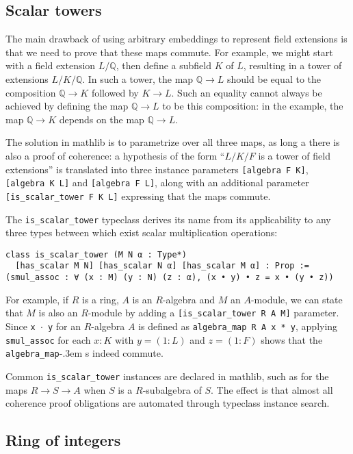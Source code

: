 \documentclass[a4paper,USenglish,cleveref, autoref, thm-restate]{lipics-v2021}
\newcommand{\lean}[1]{\texttt{#1}\xspace} %
\newcommand{\mathlib}{\textsf{mathlib}\xspace}
\newcommand{\Q}{\mathbb{Q}}
\begin{document}
\subsection{Scalar towers} \label{sec:scalar_tower}

The main drawback of using arbitrary embeddings to represent field extensions is that we need to prove that these maps commute.
For example, we might start with a field extension $L / \Q$, then define a subfield $K$ of $L$,
resulting in a tower of extensions $L / K / \Q$.
In such a tower, the map $\Q \to L$ should be equal to the composition $\Q \to K$ followed by $K \to L$.
Such an equality cannot always be achieved by defining the map $\Q \to L$ to be this composition: in the example, the map $\Q \to K$ depends on the map $\Q \to L$.

The solution in \mathlib is to parametrize over all three maps, as long a there is also a proof of coherence:
a hypothesis of the form ``$L / K / F$ is a tower of field extensions'' is translated into three instance parameters \lean{[algebra F K]}, \lean{[algebra K L]} and \lean{[algebra F L]},
along with an additional parameter \lean{[is\_scalar\_tower F K L]} expressing that the maps commute.

The \lean{is\_scalar\_tower} typeclass derives its name from its applicability to any three types between which exist scalar multiplication operations:
\begin{lstlisting}
class is_scalar_tower (M N α : Type*)
  [has_scalar M N] [has_scalar N α] [has_scalar M α] : Prop :=
(smul_assoc : ∀ (x : M) (y : N) (z : α), (x • y) • z = x • (y • z))
\end{lstlisting}
For example, if $R$ is a ring, $A$ is an $R$-algebra and $M$ an $A$-module, we can state that $M$ is also an $R$-module by adding a \lean{[is\_scalar\_tower R A M]} parameter.
Since \lean{x~$\cdot$~y} for an $R$-algebra $A$ is defined as \lean{algebra\_map R A x * y}, applying \lean{smul\_assoc} for each $x : K$ with $y = (1 : L)$ and $z = (1 : F)$ shows that the \lean{algebra\_map}\kern-.3em s indeed commute.

Common \lean{is\_scalar\_tower} instances are declared in \mathlib,
such as for the maps $R \to S \to A$ when $S$ is a $R$-subalgebra of $S$.
The effect is that almost all coherence proof obligations are automated through typeclass instance search.

\subsection{Ring of integers} \label{sec:ring-of-integers}
\end{document}
